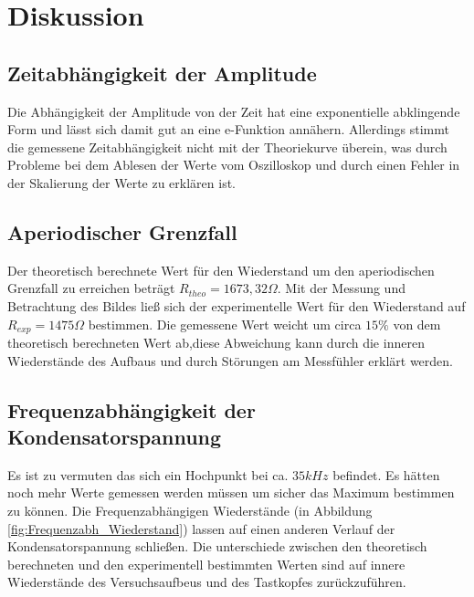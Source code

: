\newpage
\section{Diskussion}
\label{sec:Diskussion}
\subsection{Zeitabhängigkeit der Amplitude}
Die Abhängigkeit der Amplitude von der Zeit hat eine exponentielle abklingende Form und lässt sich damit gut an eine e-Funktion annähern.
Allerdings stimmt die gemessene Zeitabhängigkeit nicht mit der Theoriekurve überein, was durch Probleme bei dem Ablesen der Werte vom Oszilloskop
und durch einen Fehler in der Skalierung der Werte zu erklären ist.
\subsection{Aperiodischer Grenzfall}
Der theoretisch berechnete Wert für den Wiederstand um den aperiodischen Grenzfall zu erreichen beträgt $R_{theo}=1673,32 \Omega$.
Mit der Messung und Betrachtung des Bildes ließ sich der experimentelle Wert für den Wiederstand auf $R_{exp} = 1475\Omega$ bestimmen.
Die gemessene Wert weicht um circa $15\%$ von dem theoretisch berechneten Wert ab,diese Abweichung kann durch die inneren Wiederstände des Aufbaus und durch Störungen am Messfühler erklärt werden.

\subsection{Frequenzabhängigkeit der Kondensatorspannung}
Es ist zu vermuten das sich ein Hochpunkt bei ca. $35kHz$ befindet.
Es hätten noch mehr Werte gemessen werden müssen um sicher das Maximum bestimmen zu können.
Die Frequenzabhängigen Wiederstände (in Abbildung \ref{fig:Frequenzabh_Wiederstand}) lassen auf einen anderen Verlauf der Kondensatorspannung schließen.
Die unterschiede zwischen den theoretisch berechneten und den experimentell bestimmten Werten sind auf innere Wiederstände des Versuchsaufbeus und des Tastkopfes zurückzuführen.